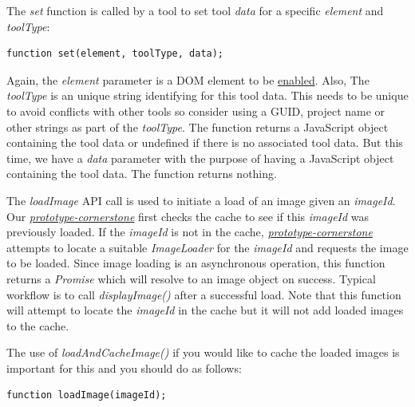 \documentclass{tufte-book} %
\begin{document}
\hfill

The \textit{set} function is called by a tool to set tool \textit{data} for a specific \textit{element} and \textit{toolType}:

\hfill

\begin{lstlisting}
function set(element, toolType, data);
\end{lstlisting}

\hfill

Again, the \textit{element} parameter is a DOM element to be \href{https://github.com/cornerstonejs/cornerstone/wiki/enabled-element}{enabled}. Also, The \textit{toolType} is an unique string identifying for this tool data. This needs to be unique to avoid conflicts with other tools so consider using a GUID, project name or other strings as part of the \textit{toolType}. The function returns a JavaScript object containing the tool data or undefined if there is no associated tool data. But this time, we have a \textit{data} parameter with the purpose of having a JavaScript object containing the tool data. The function returns nothing.

\hfill

The \textit{loadImage} API call is used to initiate a load of an image given an \textit{imageId}. Our \href{https://github.com/MIMBCD-UI/prototype-cornerstone}{\textit{prototype-cornerstone}} first checks the cache to see if this \textit{imageId} was previously loaded. If the \textit{imageId} is not in the cache, \href{https://github.com/MIMBCD-UI/prototype-cornerstone}{\textit{prototype-cornerstone}} attempts to locate a suitable \textit{ImageLoader} for the \textit{imageId} and requests the image to be loaded. Since image loading is an asynchronous operation, this function returns a \textit{Promise} which will resolve to an image object on success. Typical workflow is to call \textit{displayImage()} after a successful load. Note that this function will attempt to locate the \textit{imageId} in the cache but it will not add loaded images to the cache.

\hfill

The use of \textit{loadAndCacheImage()} if you would like to cache the loaded images is important for this and you should do as follows:

\hfill

\begin{lstlisting}
function loadImage(imageId);
\end{lstlisting}
\end{document}
